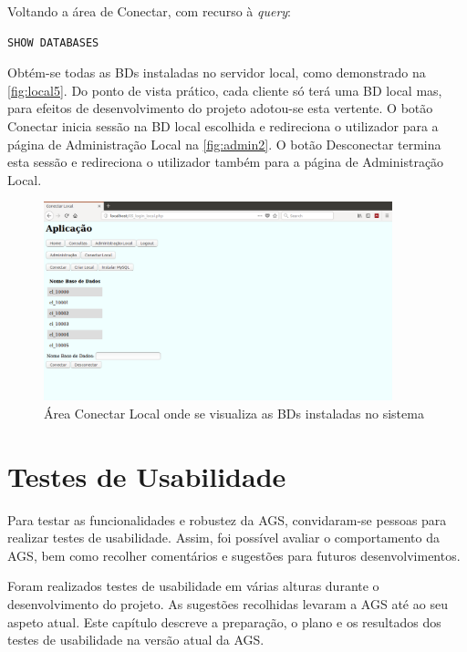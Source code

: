 \documentclass[11pt,twoside,a4paper]{report}
\begin{document}
Voltando a área de Conectar, com recurso à \textit{query}:
\begin{lstlisting}[language = SQL]
	SHOW DATABASES
\end{lstlisting}
Obtém-se todas as BDs instaladas no servidor local, como demonstrado na \autoref{fig:local5}. Do ponto de vista prático, cada cliente só terá uma BD local mas, para efeitos de desenvolvimento do projeto adotou-se esta vertente. O botão Conectar inicia sessão na BD local escolhida e redireciona o utilizador para a página de Administração Local na \autoref{fig:admin2}. O botão Desconectar termina esta sessão e redireciona o utilizador também para a página de Administração Local.
\begin{figure}[H]
	\begin{center}
		\includegraphics[width=0.9\textwidth]{local05} %
		\caption[Área Conectar Local com BDs locais]{Área Conectar Local onde se visualiza as BDs instaladas no sistema}
		\label{fig:local5}
	\end{center}
\end{figure}

\cleardoublepage
\chapter{Testes de Usabilidade}
\label{chap:usabilidade}
Para testar as funcionalidades e robustez da AGS, convidaram-se pessoas para realizar testes de usabilidade. Assim, foi possível avaliar o comportamento da AGS, bem como recolher comentários e sugestões para futuros desenvolvimentos.\par 
Foram realizados testes de usabilidade em várias alturas durante o desenvolvimento do projeto. As sugestões recolhidas levaram a AGS até ao seu aspeto atual. Este capítulo descreve a preparação, o plano e os resultados dos testes de usabilidade na versão atual da AGS.
\end{document}
